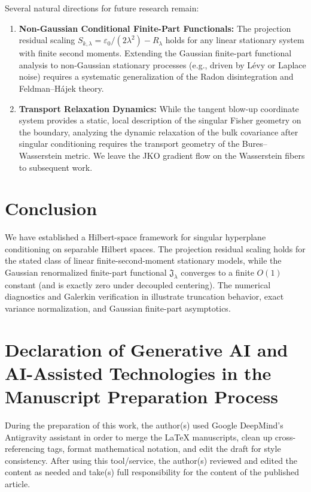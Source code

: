 \documentclass[11pt]{amsart}
\theoremstyle{plain}
\theoremstyle{definition}
\theoremstyle{remark}
\begin{document}
    Several natural directions for future research remain:
    \begin{enumerate}
        \item[(i)] \textbf{Non-Gaussian Conditional Finite-Part Functionals:} The projection residual scaling $S_{k,\lambda} = \varepsilon_0/(2\lambda^2) - R_\lambda$ holds for any linear stationary system with finite second moments. Extending the Gaussian finite-part functional analysis to non-Gaussian stationary processes (e.g., driven by L\'{e}vy or Laplace noise) requires a systematic generalization of the Radon disintegration and Feldman--H\'{a}jek theory.
        \item[(ii)] \textbf{Transport Relaxation Dynamics:} While the tangent blow-up coordinate system provides a static, local description of the singular Fisher geometry on the boundary, analyzing the dynamic relaxation of the bulk covariance after singular conditioning requires the transport geometry of the Bures--Wasserstein metric. We leave the JKO gradient flow \cite{jordan1998variational} on the Wasserstein fibers to subsequent work.
    \end{enumerate}

    \section{Conclusion}
    \label{sec:conclusion}

    We have established a Hilbert-space framework for singular hyperplane conditioning on separable Hilbert spaces. The projection residual scaling holds for the stated class of linear finite-second-moment stationary models, while the Gaussian renormalized finite-part functional $\mathfrak{J}_\lambda$ converges to a finite $O(1)$ constant (and is exactly zero under decoupled centering). The numerical diagnostics and Galerkin verification in  illustrate truncation behavior, exact variance normalization, and Gaussian finite-part asymptotics.

    \section*{Declaration of Generative AI and AI-Assisted Technologies in the Manuscript Preparation Process}

    During the preparation of this work, the author(s) used Google DeepMind's Antigravity assistant in order to merge the LaTeX manuscripts, clean up cross-referencing tags, format mathematical notation, and edit the draft for style consistency. After using this tool/service, the author(s) reviewed and edited the content as needed and take(s) full responsibility for the content of the published article.
\end{document}
